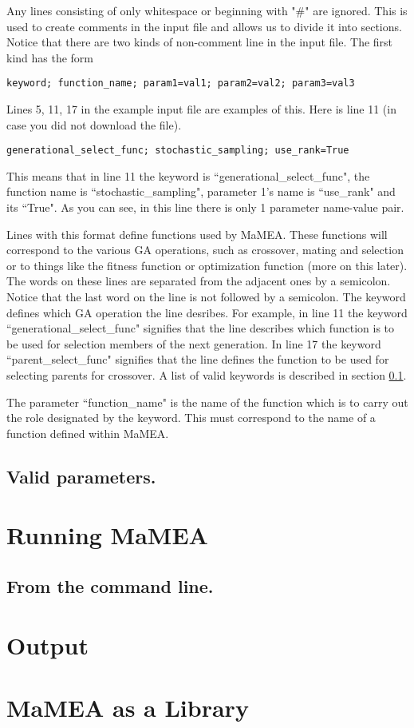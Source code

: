 \documentclass{article}
\begin{document}
Any lines consisting of only whitespace or beginning with "\#" are ignored. This is used to create comments in the input file and allows us to divide it into sections. Notice that there are two kinds of non-comment line in the input file. The first kind has the form
\begin{verbatim}
keyword; function_name; param1=val1; param2=val2; param3=val3
\end{verbatim}
Lines 5, 11, 17 in the example input file are examples of this. Here is line 11 (in case you did not download the file).
\begin{verbatim}
generational_select_func; stochastic_sampling; use_rank=True
\end{verbatim}
This means that in line 11 the keyword is ``generational\_select\_func", the function name is ``stochastic\_sampling", parameter 1's name is ``use\_rank" and its ``True". As you can see, in this line there is only 1 parameter name-value pair.

Lines with this format define functions used by MaMEA. These functions will correspond to the various GA operations, such as crossover, mating and selection or to things like the fitness function or optimization function (more on this later). The words on these lines are separated from the adjacent ones by a semicolon. Notice that the last word on the line is not followed by a semicolon. The keyword defines which GA operation the line desribes. For example, in line 11 the keyword ``generational\_select\_func" signifies that the line describes which function is to be used for selection members of the next generation. In line 17 the keyword ``parent\_select\_func" signifies that the line defines the function to be used for selecting parents for crossover. A list of valid keywords is described in section \ref{input_files_valid_parameters}.

The parameter ``function\_name" is the name of the function which is to carry out the role designated by the keyword. This must correspond to the name of a function defined within MaMEA.



\subsection{Valid parameters.}
\label{input_files_valid_parameters}

\section{Running MaMEA}

\subsection{From the command line.}


\section{Output}

\section{MaMEA as a Library}
\end{document}
